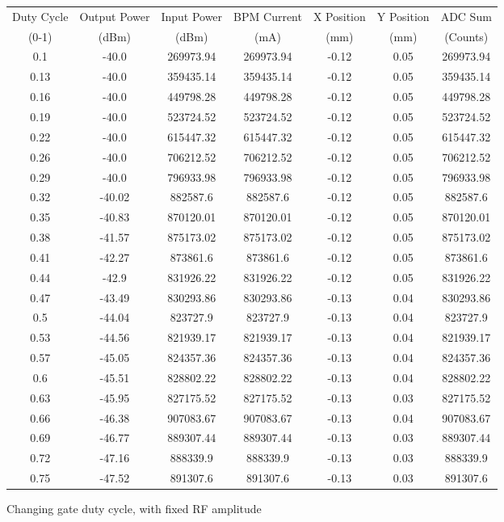 \documentclass[a4paper, 11pt]{article}%
\begin{document}
%
\begin{figure}[htbp]%
\centering%
\caption{Changing gate duty cycle, with fixed RF amplitude }%
\begin{tabular}{|c|c|c|c|c|c|c|}%
\hline%
Duty Cycle&Output Power&Input Power&BPM Current&X Position&Y Position&ADC Sum\\%
(0{-}1)&(dBm)&(dBm)&(mA)&(mm)&(mm)&(Counts)\\%
\hline%
0.1&{-}40.0&269973.94&269973.94&{-}0.12&0.05&269973.94\\%
0.13&{-}40.0&359435.14&359435.14&{-}0.12&0.05&359435.14\\%
0.16&{-}40.0&449798.28&449798.28&{-}0.12&0.05&449798.28\\%
0.19&{-}40.0&523724.52&523724.52&{-}0.12&0.05&523724.52\\%
0.22&{-}40.0&615447.32&615447.32&{-}0.12&0.05&615447.32\\%
0.26&{-}40.0&706212.52&706212.52&{-}0.12&0.05&706212.52\\%
0.29&{-}40.0&796933.98&796933.98&{-}0.12&0.05&796933.98\\%
0.32&{-}40.02&882587.6&882587.6&{-}0.12&0.05&882587.6\\%
0.35&{-}40.83&870120.01&870120.01&{-}0.12&0.05&870120.01\\%
0.38&{-}41.57&875173.02&875173.02&{-}0.12&0.05&875173.02\\%
0.41&{-}42.27&873861.6&873861.6&{-}0.12&0.05&873861.6\\%
0.44&{-}42.9&831926.22&831926.22&{-}0.12&0.05&831926.22\\%
0.47&{-}43.49&830293.86&830293.86&{-}0.13&0.04&830293.86\\%
0.5&{-}44.04&823727.9&823727.9&{-}0.13&0.04&823727.9\\%
0.53&{-}44.56&821939.17&821939.17&{-}0.13&0.04&821939.17\\%
0.57&{-}45.05&824357.36&824357.36&{-}0.13&0.04&824357.36\\%
0.6&{-}45.51&828802.22&828802.22&{-}0.13&0.04&828802.22\\%
0.63&{-}45.95&827175.52&827175.52&{-}0.13&0.03&827175.52\\%
0.66&{-}46.38&907083.67&907083.67&{-}0.13&0.04&907083.67\\%
0.69&{-}46.77&889307.44&889307.44&{-}0.13&0.03&889307.44\\%
0.72&{-}47.16&888339.9&888339.9&{-}0.13&0.03&888339.9\\%
0.75&{-}47.52&891307.6&891307.6&{-}0.13&0.03&891307.6\\%

\end{tabular}
\end{figure}
\end{document}
